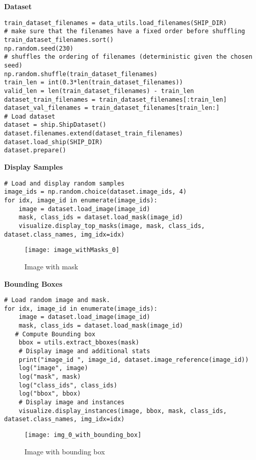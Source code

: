 \textbf{Dataset}
\begin{lstlisting}
train_dataset_filenames = data_utils.load_filenames(SHIP_DIR)
# make sure that the filenames have a fixed order before shuffling
train_dataset_filenames.sort() 
np.random.seed(230)
# shuffles the ordering of filenames (deterministic given the chosen seed)
np.random.shuffle(train_dataset_filenames) 
train_len = int(0.3*len(train_dataset_filenames))
valid_len = len(train_dataset_filenames) - train_len
dataset_train_filenames = train_dataset_filenames[:train_len]
dataset_val_filenames = train_dataset_filenames[train_len:]
# Load dataset
dataset = ship.ShipDataset()
dataset.filenames.extend(dataset_train_filenames)
dataset.load_ship(SHIP_DIR)
dataset.prepare()
\end{lstlisting}

\textbf{Display Samples}
\begin{lstlisting}
# Load and display random samples
image_ids = np.random.choice(dataset.image_ids, 4)
for idx, image_id in enumerate(image_ids):
    image = dataset.load_image(image_id)
    mask, class_ids = dataset.load_mask(image_id)
    visualize.display_top_masks(image, mask, class_ids, dataset.class_names, img_idx=idx)
\end{lstlisting}

\begin{figure}[h!]
  \centering
  \texttt{[image: image\_withMasks\_0]}
  \caption[Random image with mask]
   {Image with mask}
   \label{fig:rndimg}
\end{figure}

\textbf{Bounding Boxes}
\begin{lstlisting}
# Load random image and mask.
for idx, image_id in enumerate(image_ids):
    image = dataset.load_image(image_id)
    mask, class_ids = dataset.load_mask(image_id)
   # Compute Bounding box
    bbox = utils.extract_bboxes(mask)
    # Display image and additional stats
    print("image_id ", image_id, dataset.image_reference(image_id))
    log("image", image)
    log("mask", mask)
    log("class_ids", class_ids)
    log("bbox", bbox)
    # Display image and instances
    visualize.display_instances(image, bbox, mask, class_ids, dataset.class_names, img_idx=idx)
\end{lstlisting}

\begin{figure}[h!]
  \centering
  \texttt{[image: img\_0\_with\_bounding\_box]}
  \caption[Random image with bounding box]
   {Image with bounding box}
   \label{fig:imgbbx}
\end{figure}

